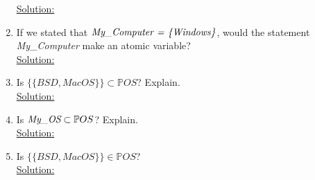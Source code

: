 \begin{enumerate}
  \noindent\underline{Solution:}\\
  \item If we stated that $\emph{{My\_Computer} = \{Windows\}}$, would the statement \emph{My\_Computer} make an atomic variable?\\
  \noindent\underline{Solution:}\\
  \item Is $\{\{BSD, MacOS\}\} \subset \mathbb{P}OS$? Explain.\\
  \noindent\underline{Solution:}\\
  \item Is $\emph{My\_OS} \subset \mathbb{P}OS$? Explain.\\
  \noindent\underline{Solution:}\\
  \item Is $\{{\{BSD, MacOS\}\}} \in \mathbb{P}OS$?\\
  \noindent\underline{Solution:}\\

  

\end{enumerate}

